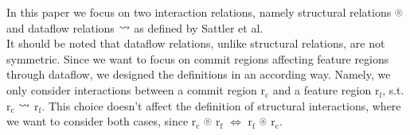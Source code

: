 In this paper we focus on two interaction relations, namely structural relations 
\includegraphics[height=0.35cm,width=0.27cm]{gfx/bigocirc.png} 
and dataflow relations 
\includegraphics[height=0.4cm,width=0.4cm]{gfx/dataflow.png} 
as defined by Sattler et al. \\
It should be noted that dataflow relations, unlike structural relations, are not symmetric. 
Since we want to focus on commit regions affecting feature regions through dataflow, we designed the definitions in an according way.
Namely, we only consider interactions between a commit region $\text{r}_\text{c}$ and a feature region $\text{r}_\text{f}$, 
s.t. $\text{r}_\text{c}$ \includegraphics[height=0.4cm,width=0.4cm]{gfx/dataflow.png} $\text{r}_\text{f}$.
This choice doesn't affect the definition of structural interactions, where we want to consider both cases, since 
$\text{r}_\text{c}$ \includegraphics[height=0.35cm,width=0.27cm]{gfx/bigocirc.png} $\text{r}_\text{f}$ $\Leftrightarrow$
$\text{r}_\text{f}$ \includegraphics[height=0.35cm,width=0.27cm]{gfx/bigocirc.png} $\text{r}_\text{c}$. \\

